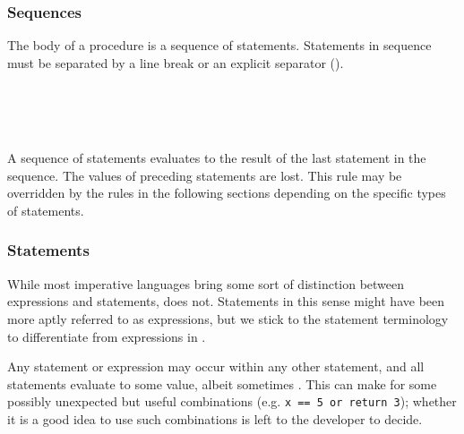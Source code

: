 \begin{prooftree}
\end{prooftree}

\subsubsection{Sequences}

The body of a procedure is a sequence of statements. Statements in sequence
must be separated by a line break or an explicit separator (\op{,}).

\begin{bnf*}
     \\
     \\
     \\
\end{bnf*}

A sequence of statements evaluates to the result of the last statement
in the sequence. The values of preceding statements are lost. This rule
may be overridden by the rules in the following sections depending on
the specific types of statements.

\begin{prooftree}
\end{prooftree}

\subsubsection{Statements}

While most imperative languages bring some sort of distinction between
expressions and statements, \Prose{} does not. Statements in this
sense might have been more aptly referred to as expressions, but we
stick to the statement terminology to differentiate from expressions
in \Poetry{}.

Any statement or expression may occur within any other statement, and
all statements evaluate to some value, albeit sometimes .
This can make for some possibly unexpected but useful combinations
(e.g. \texttt{x == 5 or return 3}); whether it is a good idea to use
such combinations is left to the developer to decide.

